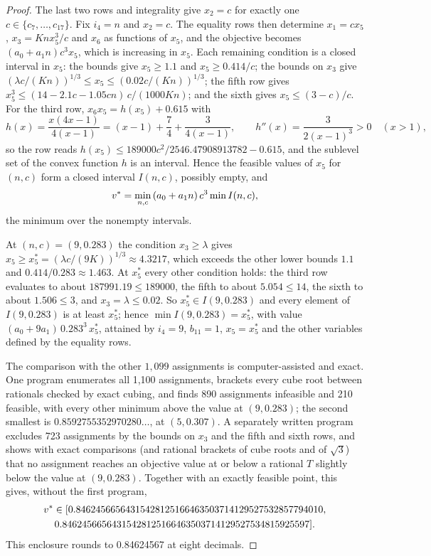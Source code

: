 \begin{proof}
The last two rows and integrality give $x_2=c$ for exactly one $c\in\{c_7,\dots,c_{17}\}$.
Fix $i_4=n$ and $x_2=c$.
The equality rows then determine $x_1=cx_5$, $x_3=Knx_5^3/c$ and $x_6$ as functions of $x_5$, and the objective becomes $(a_0+a_1n)c^3x_5$, which is increasing in $x_5$.
Each remaining condition is a closed interval in $x_5$: the bounds give $x_5\ge1.1$ and $x_5\ge0.414/c$; the bounds on $x_3$ give $(\lambda c/(Kn))^{1/3}\le x_5\le(0.02c/(Kn))^{1/3}$; the fifth row gives $x_5^3\le(14-2.1c-1.05cn)\,c/(1000Kn)$; and the sixth gives $x_5\le(3-c)/c$.
For the third row, $x_6x_5=h(x_5)+0.615$ with
\[
  h(x)=\frac{x(4x-1)}{4(x-1)}=(x-1)+\frac74+\frac{3}{4(x-1)},\qquad h''(x)=\frac{3}{2(x-1)^3}>0\quad(x>1),
\]
so the row reads $h(x_5)\le189000c^2/2546.47908913782-0.615$, and the sublevel set of the convex function $h$ is an interval.
Hence the feasible values of $x_5$ for $(n,c)$ form a closed interval $I(n,c)$, possibly empty, and
\[
  v^{*}=\min_{n,c}\,(a_0+a_1n)\,c^3\min I(n,c),
\]
the minimum over the nonempty intervals.

At $(n,c)=(9,0.283)$ the condition $x_3\ge\lambda$ gives $x_5\ge x_5^\ast=(\lambda c/(9K))^{1/3}\approx4.3217$, which exceeds the other lower bounds $1.1$ and $0.414/0.283\approx1.463$.
At $x_5^\ast$ every other condition holds: the third row evaluates to about $187991.19\le189000$, the fifth to about $5.054\le14$, the sixth to about $1.506\le3$, and $x_3=\lambda\le0.02$.
So $x_5^\ast\in I(9,0.283)$ and every element of $I(9,0.283)$ is at least $x_5^\ast$; hence $\min I(9,0.283)=x_5^\ast$, with value $(a_0+9a_1)\,0.283^3\,x_5^\ast$, attained by $i_4=9$, $b_{11}=1$, $x_5=x_5^\ast$ and the other variables defined by the equality rows.

The comparison with the other $1{,}099$ assignments is computer-assisted and exact.
One program enumerates all 1,100 assignments, brackets every cube root between rationals checked by exact cubing, and finds 890 assignments infeasible and 210 feasible, with every other minimum above the value at $(9,0.283)$; the second smallest is $0.8592755352970280\ldots$, at $(5,0.307)$.
A separately written program excludes 723 assignments by the bounds on $x_3$ and the fifth and sixth rows, and shows with exact comparisons (and rational brackets of cube roots and of $\sqrt3$) that no assignment reaches an objective value at or below a rational $T$ slightly below the value at $(9,0.283)$.
Together with an exactly feasible point, this gives, without the first program,
\begin{multline*}
  v^{*}\in[0.84624566564315428125166463503714129527532857794010,\\
  0.84624566564315428125166463503714129527534815925597].
\end{multline*}
This enclosure rounds to 0.84624567 at eight decimals.
\end{proof}

